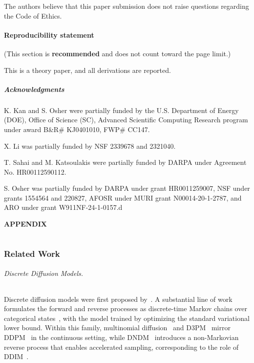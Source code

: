 \documentclass{article} %
\begin{document}
The authors believe that this paper submission does not raise questions regarding the Code of Ethics.

\subsection*{Reproducibility statement}
(This section is \textbf{recommended} and does not count toward the page limit.)

This is a theory paper, and all derivations are reported.


\subsubsection*{Acknowledgments}
K. Kan and S. Osher were partially funded by the U.S. Department of Energy (DOE), Office of Science (SC), Advanced Scientific Computing Research program under award B\&R\# KJ0401010, FWP\# CC147.

X. Li was partially funded by NSF 2339678 and 2321040.

T. Sahai and M. Katsoulakis were partially funded by DARPA under Agreement No. HR00112590112. 

S. Osher was partially funded by  DARPA under grant HR0011259007,  NSF under grants 1554564 and 220827, AFOSR under MURI grant N00014-20-1-2787, and ARO under grant W911NF-24-1-0157.d





\newpage

\appendix
{\centering\bfseries\Huge APPENDIX\par}   %
\renewcommand{\thepart}{}
\renewcommand{\partname}{}
\part{}                  %
\localtableofcontents

\bigskip

\section{Related Work}
\paragraph{Discrete Diffusion Models.} Discrete diffusion models were first proposed by~\citet{sohl2015deep}. A substantial line of work formulates the forward and reverse processes as discrete-time Markov chains over categorical states~\citep{austin2021structured,hoogeboom2021argmax,chen2024fast}, with the model trained by optimizing the standard variational lower bound. Within this family, multinomial diffusion~\citep{hoogeboom2021argmax} and D3PM~\citep{austin2021structured} mirror DDPM~\citep{ho2020denoising} in the continuous setting, while DNDM~\citep{chen2024fast} introduces a non-Markovian reverse process that enables accelerated sampling, corresponding to the role of DDIM~\citep{song2021denoising}.
\end{document}
